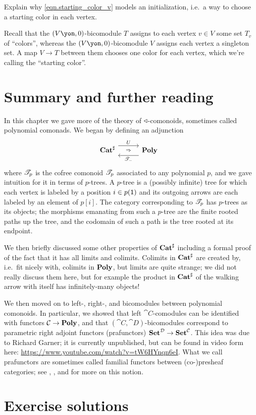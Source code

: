 \documentclass[Book-Poly]{subfiles}
\begin{document}
\begin{exercise}
Explain why \eqref{eqn.starting_color_v} models an initialization, i.e.\ a way to choose a starting color in each vertex.
\begin{solution}
Recall that the $(V\yon,0)$-bicomodule $T$ assigns to each vertex $v\in V$ some set $T_v$ of ``colors'', whereas the $(V\yon,0)$-bicomodule $V$ assigns each vertex a singleton set. A map $V\to T$ between them chooses one color for each vertex, which we're calling the ``starting color''.
\end{solution}
\end{exercise}


\section{Summary and further reading}

In this chapter we gave more of the theory of $\mathbin{\triangleleft}$-comonoids, sometimes called polynomial comonads. We began by defining an adjunction
\[
\adj{\smcat^\sharp}{U}{\cofree{-}}{\poly}
\]
where $\mathscr{T}_{p}$ is the cofree comonoid $\mathscr{T}_{p}$ associated to any polynomial $p$, and we gave intuition for it in terms of $p$-trees. A $p$-tree is a (possibly infinite) tree for which each vertex is labeled by a position $i\in p(\textsf{1})$ and its outgoing arrows are each labeled by an element of $p[i]$. The category corresponding to $\mathscr{T}_{p}$ has $p$-trees as its objects; the morphisms emanating from such a $p$-tree are the finite rooted paths up the tree, and the codomain of such a path is the tree rooted at its endpoint.

We then briefly discussed some other properties of $\mathbf{Cat}^\sharp$ including a formal proof of the fact that it has all limits and colimits. Colimits in $\mathbf{Cat}^\sharp$ are created by, i.e.\ fit nicely with, colimits in $\mathbf{Poly}$, but limits are quite strange; we did not really discuss them here, but for example the product in $\mathbf{Cat}^\sharp$ of the walking arrow \fbox{$\bullet\to\bullet$} with itself has infinitely-many objects!

We then moved on to left-, right-, and bicomodules between polynomial comonoids. In particular, we showed that left $\cat{C}$-comodules can be identified with functors $\mathcal{C}\to\mathbf{Poly}$, and that $(\cat{C},\cat{D})$-bicomodules correspond to parametric right adjoint functors (prafunctors) $\mathbf{Set}^{\mathcal{D}}\to\mathbf{Set}^{\mathcal{C}}$. This idea was due to Richard Garner; it is currently unpublished, but can be found in video form here: \url{https://www.youtube.com/watch?v=tW6HYnqn6eI}. What we call prafunctors are sometimes called familial functors between (co-)presheaf categories; see \cite{weber2007theory}, \cite{garner2018shapely}, and \cite{shapiro2021familial} for more on this notion.



\section{Exercise solutions}
{\footnotesize
}
\end{document}
